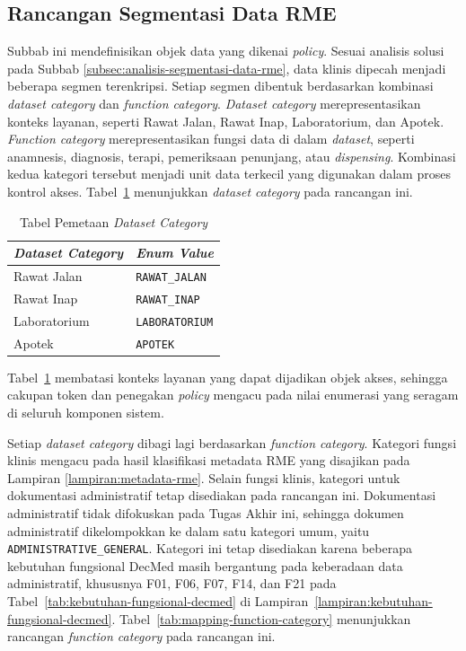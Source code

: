 \subsection{Rancangan Segmentasi Data RME}
\label{subsec:rancangan-segmentasi-data-rme}

Subbab ini mendefinisikan objek data yang dikenai \textit{policy}. Sesuai analisis solusi pada Subbab \ref{subsec:analisis-segmentasi-data-rme}, data klinis dipecah menjadi beberapa segmen terenkripsi. Setiap segmen dibentuk berdasarkan kombinasi \textit{dataset category} dan \textit{function category}. \textit{Dataset category} merepresentasikan konteks layanan, seperti Rawat Jalan, Rawat Inap, Laboratorium, dan Apotek. \textit{Function category} merepresentasikan fungsi data di dalam \textit{dataset}, seperti anamnesis, diagnosis, terapi, pemeriksaan penunjang, atau \textit{dispensing}. Kombinasi kedua kategori tersebut menjadi unit data terkecil yang digunakan dalam proses kontrol akses. Tabel~\ref{tab:mapping-dataset-category} menunjukkan \textit{dataset category} pada rancangan ini.

\begin{table}[H]
	\centering
	\caption{Tabel Pemetaan \textit{Dataset Category}}
	\label{tab:mapping-dataset-category}
	\small
	\begin{tabular}{|p{}|p{}|}
		\hline
		\textbf{\textit{Dataset Category}} & \textbf{\textit{Enum Value}} \\ \hline
		Rawat Jalan                        & \texttt{RAWAT\_JALAN}        \\ \hline
		Rawat Inap                         & \texttt{RAWAT\_INAP}         \\ \hline
		Laboratorium                       & \texttt{LABORATORIUM}        \\ \hline
		Apotek                             & \texttt{APOTEK}              \\ \hline
	\end{tabular}
\end{table}

Tabel~\ref{tab:mapping-dataset-category} membatasi konteks layanan yang dapat dijadikan objek akses, sehingga cakupan token dan penegakan \textit{policy} mengacu pada nilai enumerasi yang seragam di seluruh komponen sistem.

Setiap \textit{dataset category} dibagi lagi berdasarkan \textit{function category}. Kategori fungsi klinis mengacu pada hasil klasifikasi metadata RME yang disajikan pada Lampiran \ref{lampiran:metadata-rme}. Selain fungsi klinis, kategori untuk dokumentasi administratif tetap disediakan pada rancangan ini. Dokumentasi administratif tidak difokuskan pada Tugas Akhir ini, sehingga dokumen administratif dikelompokkan ke dalam satu kategori umum, yaitu \texttt{ADMINISTRATIVE\_GENERAL}. Kategori ini tetap disediakan karena beberapa kebutuhan fungsional DecMed masih bergantung pada keberadaan data administratif, khususnya F01, F06, F07, F14, dan F21 pada Tabel~\ref{tab:kebutuhan-fungsional-decmed} di Lampiran~\ref{lampiran:kebutuhan-fungsional-decmed}. Tabel~\ref{tab:mapping-function-category} menunjukkan rancangan \textit{function category} pada rancangan ini.

